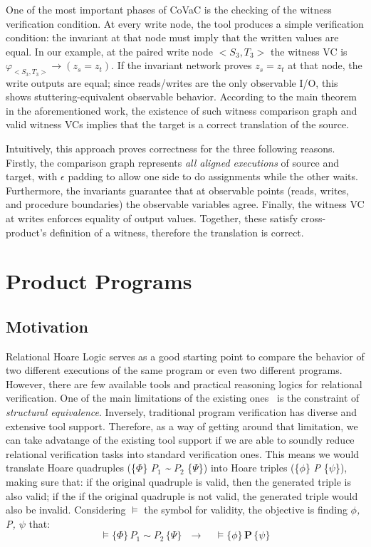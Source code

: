 One of the most important phases of CoVaC is the checking of the witness verification condition.
At every write node, the tool produces a simple verification condition: the invariant at that node must imply that the written values are equal.
In our example, at the paired write node $<S_3, T_3>$ the witness VC is ${\varphi}_{<S_3, T_3>} \rightarrow (z_s = z_t)$.
If the invariant network proves $z_s = z_t$ at that node, the write outputs are equal; since reads/writes are the only observable I/O, this shows stuttering-equivalent observable behavior.
According to the main theorem in the aforementioned work, the existence of such witness comparison graph and valid witness VCs implies that the target is a correct translation of the source.

Intuitively, this approach proves correctness for the three following reasons.
Firstly, the comparison graph represents \emph{all aligned executions} of source and target, with $\epsilon$ padding to allow one side to do assignments while the other waits.
Furthermore, the invariants guarantee that at observable points (reads, writes, and procedure boundaries) the observable variables agree.
Finally, the witness VC at writes enforces equality of output values.
Together, these satisfy cross-product's definition of a witness, therefore the translation is correct.


\FloatBarrier
\section{Product Programs} 
\label{sec:product_programs}

\subsection{Motivation} 
\label{subsec:product_programs_motivation}

Relational Hoare Logic serves as a good starting point to compare the behavior of two different executions of the same program or even two different programs.
However, there are few available tools and practical reasoning logics for relational verification.
One of the main limitations of the existing ones~\cite{DBLP:conf/popl/Benton04, DBLP:journals/tcs/Yang07} is the constraint of \emph{structural equivalence}.
Inversely, traditional program verification has diverse and extensive tool support.
Therefore, as a way of getting around that limitation, we can take advatange of the existing tool support if we are able to soundly reduce relational verification tasks into standard verification ones.
This means we would translate Hoare quadruples (\{$\Phi$\} \emph{$P_1$} \emph{\textasciitilde} \emph{$P_2$} \{$\Psi$\}) into Hoare triples (\{$\phi$\} \emph{P} \{$\psi$\}), making sure that: if the original quadruple is valid, then the generated triple is also valid; if the if the original quadruple is not valid, the generated triple would also be invalid.
Considering $\vDash$ the symbol for validity, the objective is finding \emph{$\phi$, P, $\psi$} that:
\[ \vDash \{\Phi\} \, \textbf{$P_1$} \sim \textbf{$P_2$} \, \{\Psi\} \ \ \ \rightarrow \ \ \ \ \ \vDash \{\phi\} \, \textbf{P} \, \{\psi\} \]


